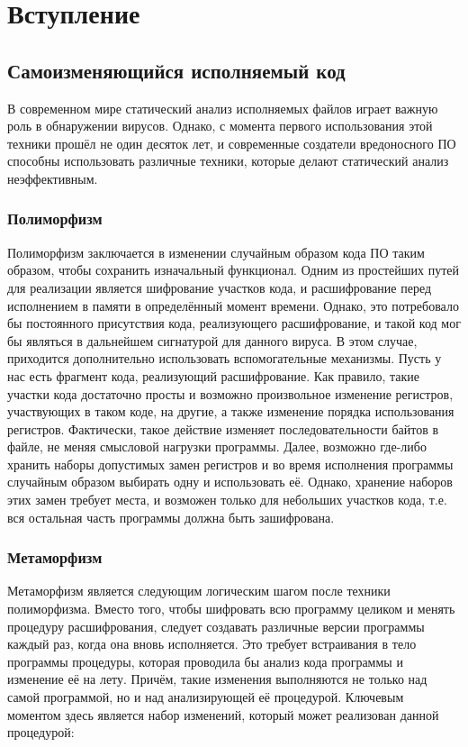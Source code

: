 \section {Вступление}
\subsection {Самоизменяющийся исполняемый код}
В современном мире статический анализ исполняемых файлов играет важную роль в обнаружении вирусов. Однако, с момента первого использования этой техники прошёл не один десяток лет, и современные создатели вредоносного ПО способны использовать  различные техники, которые делают статический анализ неэффективным.
\subsubsection {Полиморфизм}
Полиморфизм заключается в изменении случайным образом кода ПО таким образом, чтобы сохранить изначальный функционал. Одним из простейших путей для реализации является шифрование участков кода, и расшифрование перед исполнением в памяти в определённый момент времени. Однако, это потребовало бы постоянного присутствия кода, реализующего расшифрование, и такой код мог бы являться в дальнейшем сигнатурой для данного вируса. В этом случае, приходится дополнительно использовать вспомогательные механизмы. Пусть у нас есть фрагмент кода, реализующий расшифрование. Как правило, такие участки кода достаточно просты и возможно произвольное изменение регистров, участвующих в таком коде, на другие, а также изменение порядка использования регистров. Фактически, такое действие изменяет последовательности байтов в файле, не меняя смысловой нагрузки программы. Далее, возможно где-либо хранить наборы допустимых замен регистров и во время исполнения программы случайным образом выбирать одну и использовать её. Однако, хранение наборов этих замен требует места, и возможен только для небольших участков кода, т.е. вся остальная часть программы должна быть зашифрована.
\subsubsection {Метаморфизм}
Метаморфизм является следующим логическим шагом после техники полиморфизма. Вместо того, чтобы шифровать всю программу целиком и менять процедуру расшифрования, следует создавать различные версии программы каждый раз, когда она вновь исполняется. Это требует встраивания в тело программы процедуры, которая проводила бы анализ кода программы и изменение её на лету. Причём, такие изменения выполняются не только над самой программой, но и над анализирующей её процедурой. Ключевым моментом здесь является набор изменений, который может реализован данной процедурой:
\lstset{style=masm}

